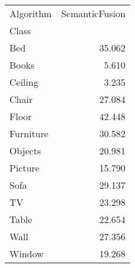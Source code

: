 \begin{tabular}{lr}
\toprule
Algorithm &  SemanticFusion \\
Class     &                 \\
\midrule
Bed       &          35.062 \\
Books     &           5.610 \\
Ceiling   &           3.235 \\
Chair     &          27.084 \\
Floor     &          42.448 \\
Furniture &          30.582 \\
Objects   &          20.981 \\
Picture   &          15.790 \\
Sofa      &          29.137 \\
TV        &          23.298 \\
Table     &          22.654 \\
Wall      &          27.356 \\
Window    &          19.268 \\
\bottomrule
\end{tabular}
